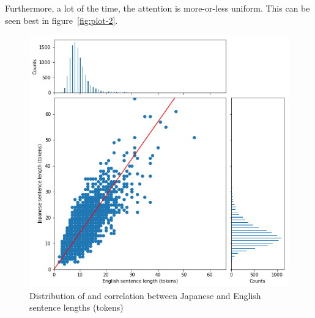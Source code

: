 \documentclass[answers]{exam}
\begin{document}
\begin{CJK}{UTF8}{min}
\begin{questions}
\begin{framed}
  Furthermore, a lot of the time, the attention is more-or-less uniform. This
  can be seen best in figure~\ref{fig:plot-2}.
\end{framed}
\end{questions}

\clearpage




\begin{figure}
  \centering
  \includegraphics[width=\linewidth]{fig-corr-toks}
  \caption[Sentence lenths (tokens)]%
  {Distribution of and correlation between Japanese and English sentence lengths (tokens)}
  \label{fig:corr-toks}
\end{figure}


\end{CJK}
\end{document}

